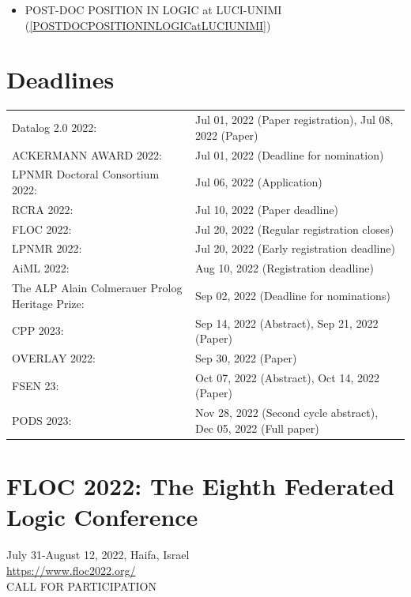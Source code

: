 \documentclass[prodmode,acmtecs]{acmsmall} %
\begin{document}
\begin{itemize}
\begin{itemize}\item POST-DOC POSITION IN LOGIC at LUCI-UNIMI (\cref{POSTDOCPOSITIONINLOGICatLUCIUNIMI})
\end{itemize} 
\end{itemize}\section{Deadlines}\label{deadlines}\begin{tabulary}{\linewidth}{LL}Datalog 2.0 2022:  & Jul 01, 2022 (Paper registration), Jul 08, 2022 (Paper) \\
ACKERMANN AWARD 2022:  & Jul 01, 2022 (Deadline for nomination) \\
LPNMR Doctoral Consortium 2022:  & Jul 06, 2022 (Application) \\
RCRA 2022:  & Jul 10, 2022 (Paper deadline) \\
FLOC 2022:  & Jul 20, 2022 (Regular registration closes) \\
LPNMR 2022:  & Jul 20, 2022 (Early registration deadline) \\
AiML 2022:  & Aug 10, 2022 (Registration deadline) \\
The ALP Alain Colmerauer Prolog Heritage Prize:  & Sep 02, 2022 (Deadline for nominations) \\
CPP 2023:  & Sep 14, 2022 (Abstract), Sep 21, 2022 (Paper) \\
OVERLAY 2022:  & Sep 30, 2022 (Paper) \\
FSEN 23:  & Oct 07, 2022 (Abstract), Oct 14, 2022 (Paper) \\
PODS 2023:  & Nov 28, 2022 (Second cycle abstract), Dec 05, 2022 (Full paper) \\
\end{tabulary}
\section{FLOC 2022: The Eighth Federated Logic Conference}\label{FLOC2022}  July 31-August 12, 2022, Haifa, Israel \\ 
  \href{https://www.floc2022.org/}{https://www.floc2022.org/}\\ 
CALL FOR PARTICIPATION 
\end{document}
